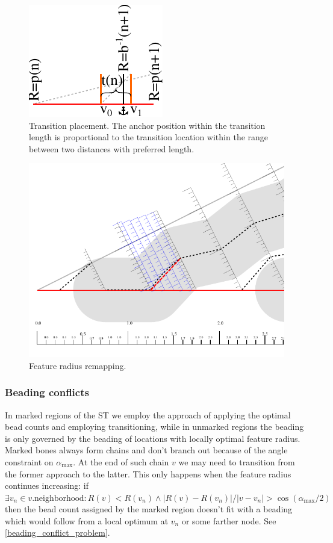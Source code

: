 \begin{figure}
\centering
\includegraphics[width=.3\columnwidth]{sources/method/transition_location_precise.pdf}
\caption{
Transition placement.
The anchor position within the transition length is proportional to the transition location within the range between two distances with preferred length. 
}
\label{transition_placement}
\end{figure}


\begin{figure}
\centering
\includegraphics[width=.9\columnwidth]{sources/method/distance_rounding_transition.pdf}
\caption{Feature radius remapping.}
\label{distance_rounding_transition}
\end{figure}


\subsubsection{Beading conflicts}
In marked regions of the ST we employ the approach of applying the optimal bead counts and employing transitioning, while in unmarked regions the beading is only governed by the beading of locations with locally optimal feature radius.
Marked bones always form chains and don't branch out because of the angle constraint on $\alpha_\text{max}$. 
At the end of such chain $v$ we may need to transition from the former approach to the latter.
This only happens when the feature radius continues increasing: if $\exists v_n \in v.\text{neighborhood}: R(v) < R(v_n) \land | R(v) - R(v_n) | / |v - v_n| >  \cos(\alpha_\text{max} / 2)$ then the bead count assigned by the marked region doesn't fit with a beading which would follow from a local optimum at $v_n$ or some farther node.
See \cref{beading_conflict_problem}.


